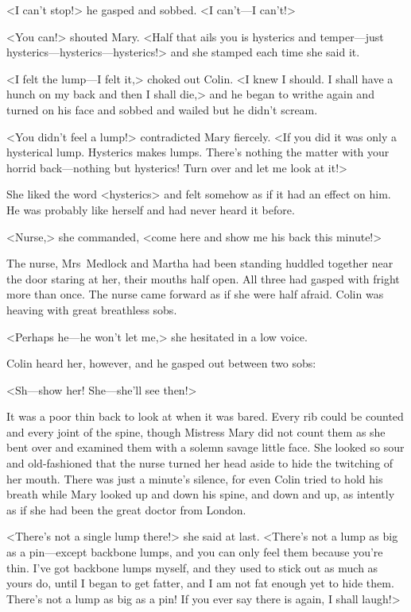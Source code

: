 <I can't stop!> he gasped and sobbed. <I can't—I can't!>

<You can!> shouted Mary. <Half that ails you is hysterics and temper—just hysterics—hysterics—hysterics!> and she stamped each time she said it.

<I felt the lump—I felt it,> choked out Colin. <I knew I should. I shall have a hunch on my back and then I shall die,> and he began to writhe again and turned on his face and sobbed and wailed but he didn't scream.

<You didn't feel a lump!> contradicted Mary fiercely. <If you did it was only a hysterical lump. Hysterics makes lumps. There's nothing the matter with your horrid back—nothing but hysterics! Turn over and let me look at it!>

She liked the word <hysterics> and felt somehow as if it had an effect on him. He was probably like herself and had never heard it before.

<Nurse,> she commanded, <come here and show me his back this minute!>

The nurse, Mrs~Medlock and Martha had been standing huddled together near the door staring at her, their mouths half open. All three had gasped with fright more than once. The nurse came forward as if she were half afraid. Colin was heaving with great breathless sobs.

<Perhaps he—he won't let me,> she hesitated in a low voice.

Colin heard her, however, and he gasped out between two sobs:

<Sh—show her! She—she'll see then!>

It was a poor thin back to look at when it was bared. Every rib could be counted and every joint of the spine, though Mistress Mary did not count them as she bent over and examined them with a solemn savage little face. She looked so sour and old-fashioned that the nurse turned her head aside to hide the twitching of her mouth. There was just a minute's silence, for even Colin tried to hold his breath while Mary looked up and down his spine, and down and up, as intently as if she had been the great doctor from London.

<There's not a single lump there!> she said at last. <There's not a lump as big as a pin—except backbone lumps, and you can only feel them because you're thin. I've got backbone lumps myself, and they used to stick out as much as yours do, until I began to get fatter, and I am not fat enough yet to hide them. There's not a lump as big as a pin! If you ever say there is again, I shall laugh!>

